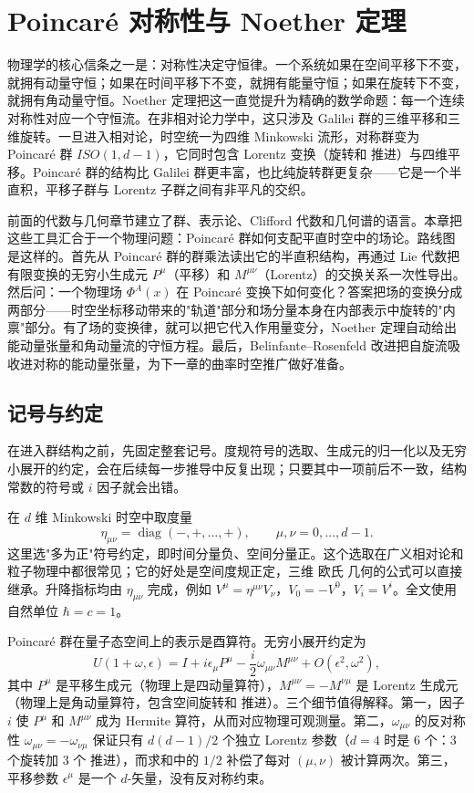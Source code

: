 \chapter{Poincaré 对称性与 Noether 定理} \label{chap:math-spacetime}

物理学的核心信条之一是：对称性决定守恒律。一个系统如果在空间平移下不变，就拥有动量守恒；如果在时间平移下不变，就拥有能量守恒；如果在旋转下不变，就拥有角动量守恒。Noether 定理把这一直觉提升为精确的数学命题：每一个连续对称性对应一个守恒流。在非相对论力学中，这只涉及 Galilei 群的三维平移和三维旋转。一旦进入相对论，时空统一为四维 Minkowski 流形，对称群变为 Poincaré 群 $ISO(1,d-1)$，它同时包含 Lorentz 变换（旋转和 推进）与四维平移。Poincaré 群的结构比 Galilei 群更丰富，也比纯旋转群更复杂——它是一个半直积，平移子群与 Lorentz 子群之间有非平凡的交织。

前面的代数与几何章节建立了群、表示论、Clifford 代数和几何谱的语言。本章把这些工具汇合于一个物理问题：Poincaré 群如何支配平直时空中的场论。路线图是这样的。首先从 Poincaré 群的群乘法读出它的半直积结构，再通过 Lie 代数把有限变换的无穷小生成元 $P^\mu$（平移）和 $M^{\mu\nu}$（Lorentz）的交换关系一次性导出。然后问：一个物理场 $\Phi^A(x)$ 在 Poincaré 变换下如何变化？答案把场的变换分成两部分——时空坐标移动带来的"轨道"部分和场分量本身在内部表示中旋转的"内禀"部分。有了场的变换律，就可以把它代入作用量变分，Noether 定理自动给出能动量张量和角动量流的守恒方程。最后，Belinfante--Rosenfeld 改进把自旋流吸收进对称的能动量张量，为下一章的曲率时空推广做好准备。

\section{记号与约定}

在进入群结构之前，先固定整套记号。度规符号的选取、生成元的归一化以及无穷小展开的约定，会在后续每一步推导中反复出现；只要其中一项前后不一致，结构常数的符号或 $i$ 因子就会出错。

在 $d$ 维 Minkowski 时空中取度量
\begin{equation*}\eta_{\mu\nu}=\operatorname{diag}(-,+,\ldots,+),\qquad \mu,\nu=0,\ldots,d-1.
\end{equation*}
这里选"多为正"符号约定，即时间分量负、空间分量正。这个选取在广义相对论和粒子物理中都很常见；它的好处是空间度规正定，三维 欧氏 几何的公式可以直接继承。升降指标均由 $\eta_{\mu\nu}$ 完成，例如 $V^\mu=\eta^{\mu\nu}V_\nu$，$V_0=-V^0$，$V_i=V^i$。全文使用自然单位 $\hbar=c=1$。

Poincaré 群在量子态空间上的表示是酉算符。无穷小展开约定为
\begin{equation}\label{eq:ms-poincare-U-expand}
{
U(1+\omega,\epsilon)=I+i\epsilon_\mu P^\mu-\frac{i}{2}\omega_{\mu\nu}M^{\mu\nu}+O(\epsilon^2,\omega^2),
}
\end{equation}
其中 $P^\mu$ 是平移生成元（物理上是四动量算符），$M^{\mu\nu}=-M^{\nu\mu}$ 是 Lorentz 生成元（物理上是角动量算符，包含空间旋转和 推进）。三个细节值得解释。第一，因子 $i$ 使 $P^\mu$ 和 $M^{\mu\nu}$ 成为 Hermite 算符，从而对应物理可观测量。第二，$\omega_{\mu\nu}$ 的反对称性 $\omega_{\mu\nu}=-\omega_{\nu\mu}$ 保证只有 $d(d-1)/2$ 个独立 Lorentz 参数（$d=4$ 时是 6 个：3 个旋转加 3 个 推进），而求和中的 $1/2$ 补偿了每对 $(\mu,\nu)$ 被计算两次。第三，平移参数 $\epsilon^\mu$ 是一个 $d$-矢量，没有反对称约束。

